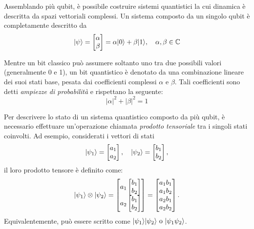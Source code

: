 Assemblando più qubit, è possibile costruire sistemi quantistici la cui dinamica è descritta da spazi vettoriali complessi. Un sistema composto da un singolo qubit è completamente descritto da
\begin{equation}
	\lvert\psi\rangle = \begin{bmatrix}
		\alpha\\ \beta
	\end{bmatrix} = \alpha \lvert0\rangle + \beta \lvert1\rangle,\quad \alpha,\beta \in
	\mathbb{C}
	\label{eq:1-qubit-state}
\end{equation}

Mentre un bit classico può assumere soltanto uno tra due possibili valori
(generalmente 0 e 1), un bit quantistico è denotato da una combinazione lineare
dei suoi stati base, pesata dai coefficienti complessi $\alpha$ e $\beta$. Tali
coefficienti sono detti \emph{ampiezze di probabilità} e rispettano la seguente:
\begin{equation}
	|\alpha|^2 + |\beta|^2 = 1
	\label{eq:qubit-prob}
\end{equation}

Per descrivere lo stato di un sistema quantistico composto da più qubit, è
necessario effettuare un'operazione chiamata \emph{prodotto tensoriale} tra i
singoli stati coinvolti. Ad esempio, considerati i vettori di stati
\[
\lvert\psi_1\rangle = \begin{bmatrix} a_1 \\ a_2 \end{bmatrix}, \quad \lvert\psi_2\rangle = \begin{bmatrix} b_1 \\ b_2 \end{bmatrix},
\]
il loro prodotto tensore è definito come:
\begin{equation}
\lvert\psi_1\rangle \otimes \lvert\psi_2\rangle
= \begin{bmatrix}
a_1 \begin{bmatrix} b_1 \\ b_2 \end{bmatrix} \\
a_2 \begin{bmatrix} b_1 \\ b_2 \end{bmatrix}
\end{bmatrix} =
\begin{bmatrix}
a_1 b_1 \\ a_1 b_2 \\ a_2 b_1 \\ a_2 b_2
\end{bmatrix}.
\label{eq:tensor-prod}
\end{equation}
Equivalentemente, può essere scritto come $\lvert\psi_1\rangle\lvert\psi_2\rangle \text{ o } \lvert\psi_1
\psi_2\rangle$.

